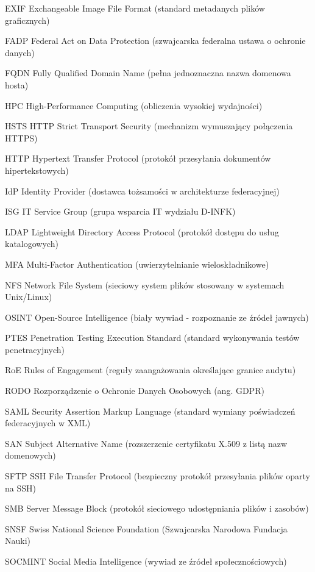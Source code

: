 \begin{abbreviations}
    \item[EXIF]  Exchangeable Image File Format (standard metadanych plików graficznych)
    \item[FADP]  Federal Act on Data Protection (szwajcarska federalna ustawa o ochronie danych)
    \item[FQDN]  Fully Qualified Domain Name (pełna jednoznaczna nazwa domenowa hosta)
    \item[HPC]   High-Performance Computing (obliczenia wysokiej wydajności)
    \item[HSTS]  HTTP Strict Transport Security (mechanizm wymuszający połączenia HTTPS)
    \item[HTTP]  Hypertext Transfer Protocol (protokół przesyłania dokumentów hipertekstowych)
    \item[IdP]   Identity Provider (dostawca tożsamości w architekturze federacyjnej)
    \item[ISG]   IT Service Group (grupa wsparcia IT wydziału D-INFK)
    \item[LDAP]  Lightweight Directory Access Protocol (protokół dostępu do usług katalogowych)
    \item[MFA]   Multi-Factor Authentication (uwierzytelnianie wieloskładnikowe)
    \item[NFS]   Network File System (sieciowy system plików stosowany w systemach Unix/Linux)
    \item[OSINT] Open-Source Intelligence (biały wywiad - rozpoznanie ze źródeł jawnych)
    \item[PTES]  Penetration Testing Execution Standard (standard wykonywania testów penetracyjnych)
    \item[RoE]   Rules of Engagement (reguły zaangażowania określające granice audytu)
    \item[RODO]  Rozporządzenie o Ochronie Danych Osobowych (ang. GDPR)
    \item[SAML]  Security Assertion Markup Language (standard wymiany poświadczeń federacyjnych w XML)
    \item[SAN]   Subject Alternative Name (rozszerzenie certyfikatu X.509 z listą nazw domenowych)
    \item[SFTP]  SSH File Transfer Protocol (bezpieczny protokół przesyłania plików oparty na SSH)
    \item[SMB]   Server Message Block (protokół sieciowego udostępniania plików i zasobów)
    \item[SNSF]  Swiss National Science Foundation (Szwajcarska Narodowa Fundacja Nauki)
    \item[SOCMINT] Social Media Intelligence (wywiad ze źródeł społecznościowych)

\end{abbreviations}
